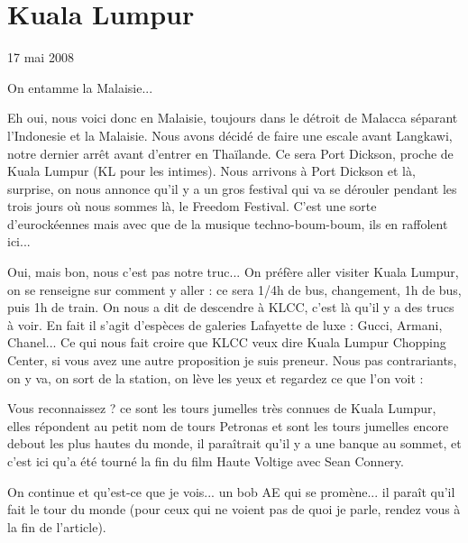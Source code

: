\section{Kuala Lumpur}

17 mai 2008

\begin{multicols}{2}

On entamme la Malaisie...

Eh oui, nous voici donc en Malaisie, toujours dans le détroit de Malacca séparant l'Indonesie et la Malaisie. Nous avons décidé de faire une escale avant Langkawi, notre dernier arrêt avant d'entrer en Thaïlande. Ce sera Port Dickson, proche de Kuala Lumpur (KL pour les intimes). Nous arrivons à Port Dickson et là, surprise, on nous annonce qu'il y a un gros festival qui va se dérouler pendant les trois jours où nous sommes là, le Freedom Festival. C'est une sorte d'eurockéennes mais avec que de la musique techno-boum-boum, ils en raffolent ici...

Oui, mais bon, nous c'est pas notre truc... On préfère aller visiter Kuala Lumpur, on se renseigne sur comment y aller : ce sera 1/4h de bus, changement, 1h de bus, puis 1h de train. On nous a dit de descendre à KLCC, c'est là qu'il y a des trucs à voir. En fait il s'agit d'espèces de galeries Lafayette de luxe : Gucci, Armani, Chanel... Ce qui nous fait croire que KLCC veux dire Kuala Lumpur Chopping Center, si vous avez une autre proposition je suis preneur. Nous pas contrariants, on y va, on sort de la station, on lève les yeux et regardez ce que l'on voit :


Vous reconnaissez ? ce sont les tours jumelles très connues de Kuala Lumpur, elles répondent au petit nom de tours Petronas et sont les tours jumelles encore debout les plus hautes du monde, il paraîtrait qu'il y a une banque au sommet, et c'est ici qu'a été tourné la fin du film Haute Voltige avec Sean Connery.

On continue et qu'est-ce que je vois... un bob AE qui se promène... il paraît qu'il fait le tour du monde (pour ceux qui ne voient pas de quoi je parle, rendez vous à la fin de l'article).



\end{multicols}
